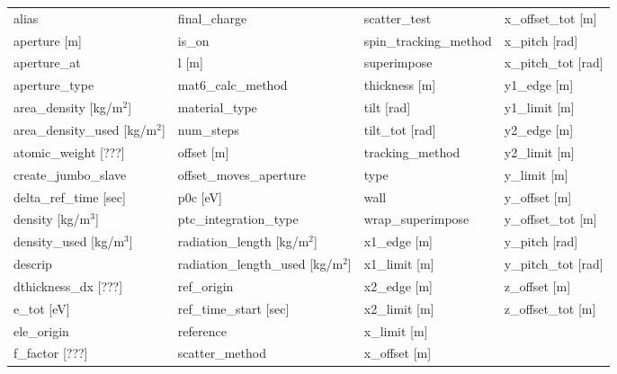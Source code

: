  \begin{tabular}{llll} \toprule
alias                            & final_charge                     & scatter_test                     & x_offset_tot [m]                 \\
aperture [m]                     & is_on                            & spin_tracking_method             & x_pitch [rad]                    \\
aperture_at                      & l [m]                            & superimpose                      & x_pitch_tot [rad]                \\
aperture_type                    & mat6_calc_method                 & thickness [m]                    & y1_edge [m]                      \\
area_density [kg/m$^2$]          & material_type                    & tilt [rad]                       & y1_limit [m]                     \\
area_density_used [kg/m$^2$]     & num_steps                        & tilt_tot [rad]                   & y2_edge [m]                      \\
atomic_weight [???]              & offset [m]                       & tracking_method                  & y2_limit [m]                     \\
create_jumbo_slave               & offset_moves_aperture            & type                             & y_limit [m]                      \\
delta_ref_time [sec]             & p0c [eV]                         & wall                             & y_offset [m]                     \\
density [kg/m$^3$]               & ptc_integration_type             & wrap_superimpose                 & y_offset_tot [m]                 \\
density_used [kg/m$^3$]          & radiation_length [kg/m$^2$]      & x1_edge [m]                      & y_pitch [rad]                    \\
descrip                          & radiation_length_used [kg/m$^2$] & x1_limit [m]                     & y_pitch_tot [rad]                \\
dthickness_dx [???]              & ref_origin                       & x2_edge [m]                      & z_offset [m]                     \\
e_tot [eV]                       & ref_time_start [sec]             & x2_limit [m]                     & z_offset_tot [m]                 \\
ele_origin                       & reference                        & x_limit [m]                      &                                  \\
f_factor [???]                   & scatter_method                   & x_offset [m]                     &                                  \\
 \bottomrule
 \end{tabular}
 \vfill
 
